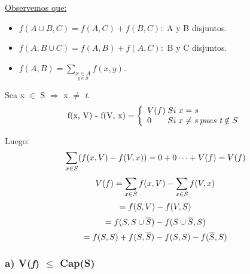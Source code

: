 \documentclass[12pt,a4paper]{report}
\begin{document}
		\underline{Observemos que:}
		\begin{itemize}
			\item $f(A \cup B, C) = f(A,C) + f(B,C):$ A y B disjuntos.
			\item $f(A, B \cup C) = f(A,B) + f(A,C):$ B y C disjuntos.
			\item $f(A,B) = \underset {\underset {y \in B} {x \in A}} \sum f(x,y).$
		\end{itemize}
		
		Sea x $\in$ S $\Rightarrow$ x $\neq$ \textit{t}.
		\begin{equation*}
			\textup{f(x, V) - f(V, x)} =
  			\left\lbrace
  			\begin{array}{l}
    		 V(f) \; Si \; x= \textit{s} \\
     		 0 \; \; \; \; \; \; \;  Si \; x \neq \textit{s} \; pues \; \textit{t} \notin S \\
  			\end{array}
 			 \right.
		\end{equation*}
		
		Luego:
		\begin{equation}
			\sum_{x \in S}(f(x, V) - f(V, x)) = 0 + 0 \dotsb + V(f) = V(f) \\
		\end{equation}
		\begin{equation}
			\vspace{5mm} \\
			V(f) = \sum_{x \in S}f(x, V) - \sum_{x \in S}f(V, x) \\
		\end{equation}
		\begin{equation}
			= f(S, V) - f(V, S) \\
		\end{equation}
        \begin{equation}
           = f(S, S \cup \overline{S}) - f(S \cup \overline{S}, S) \\
        \end{equation}
		\begin{equation}
			= f(S, S) + f(S, \overline{S}) - f(S, S) -  f(\overline{S}, S) \\
		\end{equation}
				
		\subsubsection{a) V(\textit{f}) $\leq$ Cap(S)}
			
		
		
\end{document}
